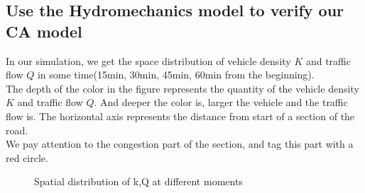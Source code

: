 \documentclass{mcmthesis}
\begin{document}
\subsection{Use the Hydromechanics model to verify our CA model}
\indent In our simulation, we get the space distribution of vehicle density $K$ and traffic flow $Q$ in some time(15min, 30min, 45min, 60min from the beginning).\\
\indent The depth of the color in the figure represents the quantity of the vehicle density $K$ and traffic flow $Q$. And deeper the color is, larger the vehicle and the traffic flow is. The horizontal axis represents the distance from start of a section of the road.\\
\indent We pay attention to the congestion part of the section, and tag this part with a red circle.\\
\begin{figure}[H]
\centering
{}
 \caption{Spatial distribution of k,Q at different moments} \label{fig:1}
\end{figure}
\end{document}
